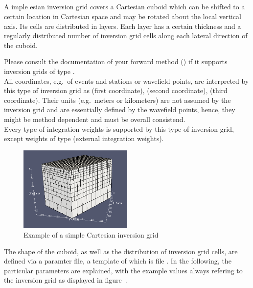 \subsection{} \label{basic_steps,sec:invgrid,sub:scart}
%
A imple esian inversion grid covers a Cartesian cuboid which can
be shifted to a certain location in Cartesian space and may be rotated about the local vertical
axis. Its cells are distributed in layers. Each layer has a certain thickness and a regularly
distributed number of inversion grid cells along each lateral direction of the cuboid.

Please consult the documentation of your forward method () if it supports
inversion grids of type . \\
All coordinates, e.g.\ of events and stations or wavefield points, are interpreted by this type of inversion grid as
 (first coordinate),  (second coordinate),  (third coordinate). Their
units (e.g.\ meters or kilometers) are not assumed by the inversion grid and are essentially defined by the wavefield
points, hence, they might be method dependent and must be overall consistend.\\
Every type of integration weights is supported by this type of inversion grid, except weights of type 
 (external integration weights).

\begin{figure}[ht]
  \centering
  \includegraphics[width=0.5\textwidth]{images/scartInversionGrid_manual.png}
  \caption{Example of a simple Cartesian inversion grid}
  \label{basic_steps,sec:invgrid,sub:scart,fig:grid}
\end{figure}

The shape of the cuboid, as well as the distribution of inversion grid cells, are defined 
via a paramter file, a template of which is file .
In the following, the particular parameters are explained, with the example
values always refering to the inversion grid as displayed in figure~.

